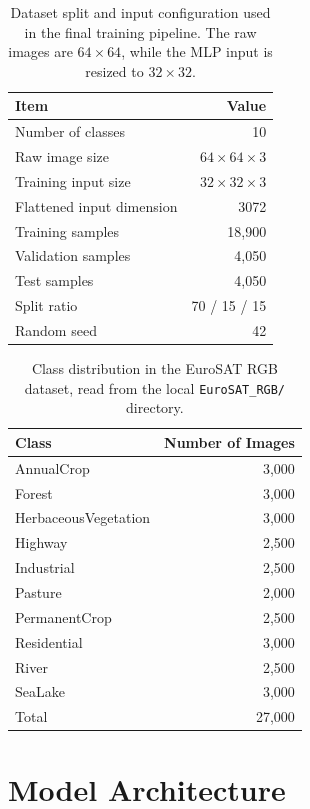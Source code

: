 \documentclass{article}
\begin{document}
\begin{table}[t]
  \caption{Dataset split and input configuration used in the final training pipeline. The raw images are \(64 \times 64\), while the MLP input is resized to \(32 \times 32\).}
  \label{tab:data_split}
  \centering
  \begin{tabular}{lr}
    \toprule
    Item & Value \\
    \midrule
    Number of classes & 10 \\
    Raw image size & \(64 \times 64 \times 3\) \\
    Training input size & \(32 \times 32 \times 3\) \\
    Flattened input dimension & 3072 \\
    Training samples & 18{,}900 \\
    Validation samples & 4{,}050 \\
    Test samples & 4{,}050 \\
    Split ratio & 70 / 15 / 15 \\
    Random seed & 42 \\
    \bottomrule
  \end{tabular}
\end{table}

\begin{table}[t]
  \caption{Class distribution in the EuroSAT RGB dataset, read from the local \texttt{EuroSAT\_RGB/} directory.}
  \label{tab:class_distribution}
  \centering
  \small
  \begin{tabular}{lr}
    \toprule
    Class & Number of Images \\
    \midrule
    AnnualCrop & 3{,}000 \\
    Forest & 3{,}000 \\
    HerbaceousVegetation & 3{,}000 \\
    Highway & 2{,}500 \\
    Industrial & 2{,}500 \\
    Pasture & 2{,}000 \\
    PermanentCrop & 2{,}500 \\
    Residential & 3{,}000 \\
    River & 2{,}500 \\
    SeaLake & 3{,}000 \\
    \midrule
    Total & 27{,}000 \\
    \bottomrule
  \end{tabular}
\end{table}

\section{Model Architecture}
\end{document}
